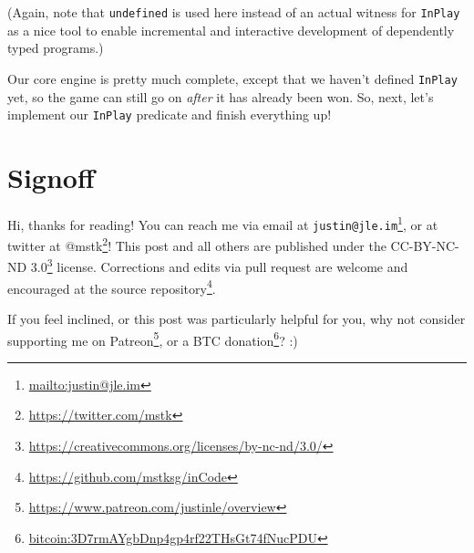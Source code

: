 \documentclass[]{article}
\renewcommand{\href}[2]{#2\footnote{\url{#1}}}
\begin{document}
(Again, note that \texttt{undefined} is used here instead of an actual witness
for \texttt{InPlay} as a nice tool to enable incremental and interactive
development of dependently typed programs.)

Our core engine is pretty much complete, except that we haven't defined
\texttt{InPlay} yet, so the game can still go on \emph{after} it has already
been won. So, next, let's implement our \texttt{InPlay} predicate and finish
everything up!

\hypertarget{signoff}{%
\section{Signoff}\label{signoff}}

Hi, thanks for reading! You can reach me via email at
\href{mailto:justin@jle.im}{\nolinkurl{justin@jle.im}}, or at twitter at
\href{https://twitter.com/mstk}{@mstk}! This post and all others are published
under the \href{https://creativecommons.org/licenses/by-nc-nd/3.0/}{CC-BY-NC-ND
3.0} license. Corrections and edits via pull request are welcome and encouraged
at \href{https://github.com/mstksg/inCode}{the source repository}.

If you feel inclined, or this post was particularly helpful for you, why not
consider \href{https://www.patreon.com/justinle/overview}{supporting me on
Patreon}, or a \href{bitcoin:3D7rmAYgbDnp4gp4rf22THsGt74fNucPDU}{BTC donation}?
:)
\end{document}
